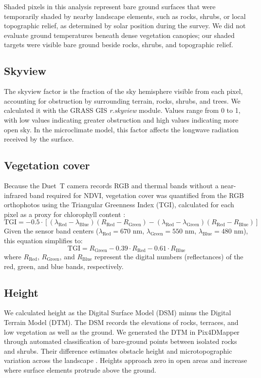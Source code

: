 \documentclass[12pt]{article}
\begin{document}
Shaded pixels in this analysis represent bare ground surfaces that were temporarily shaded by nearby landscape elements, such as rocks, shrubs, or local topographic relief, as determined by solar position during the survey. We did not evaluate ground temperatures beneath dense vegetation canopies; our shaded targets were visible bare ground beside rocks, shrubs, and topographic relief.

\subsection{Skyview}
\noindent
The skyview factor is the fraction of the sky hemisphere visible from each pixel, accounting for obstruction by surrounding terrain, rocks, shrubs, and trees. We calculated it with the GRASS GIS \textit{r.skyview} module. Values range from 0 to 1, with low values indicating greater obstruction and high values indicating more open sky. In the microclimate model, this factor affects the longwave radiation received by the surface.

\subsection{Vegetation cover}
\noindent
Because the Duet~T camera records RGB and thermal bands without a near-infrared band required for NDVI, vegetation cover was quantified from the RGB orthophotos using the Triangular Greenness Index (TGI), calculated for each pixel as a proxy for chlorophyll content \citep{hunt_2013}:
\begin{equation}
\text{TGI} = -0.5 \cdot \left[ (\lambda_{\text{Red}} - \lambda_{\text{Blue}})(R_{\text{Red}} - R_{\text{Green}}) - (\lambda_{\text{Red}} - \lambda_{\text{Green}})(R_{\text{Red}} - R_{\text{Blue}}) \right]
\end{equation}
Given the sensor band centers ($\lambda_{\text{Red}} = 670\text{ nm}$, $\lambda_{\text{Green}} = 550\text{ nm}$, $\lambda_{\text{Blue}} = 480\text{ nm}$), this equation simplifies to:
\begin{equation}
\text{TGI} = R_{\text{Green}} - 0.39 \cdot R_{\text{Red}} - 0.61 \cdot R_{\text{Blue}}
\end{equation}
where $R_{\text{Red}}$, $R_{\text{Green}}$, and $R_{\text{Blue}}$ represent the digital numbers (reflectances) of the red, green, and blue bands, respectively.

\subsection{Height}
\noindent
We calculated height as the Digital Surface Model (DSM) minus the Digital Terrain Model (DTM). The DSM records the elevations of rocks, terraces, and low vegetation as well as the ground. We generated the DTM in Pix4DMapper through automated classification of bare-ground points between isolated rocks and shrubs. Their difference estimates obstacle height and microtopographic variation across the landscape \citep[following][]{duffy_2021}. Heights approach zero in open areas and increase where surface elements protrude above the ground.
\end{document}
